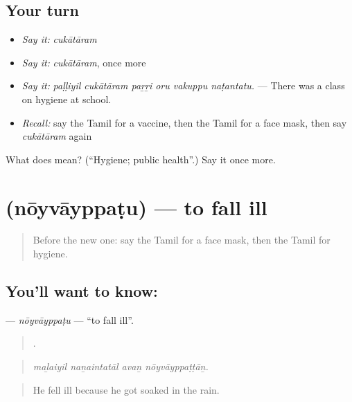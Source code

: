 \subsection*{Your turn}
\begin{itemize}
\raggedright
  \item \emph{Say it:} \emph{cukātāram}
  \item \emph{Say it:} \emph{cukātāram}, once more
  \item \emph{Say it:} \emph{paḷḷiyil cukātāram paṟṟi oru vakuppu naṭantatu.} — There was a class on hygiene at school.
  \item \emph{Recall:} say the Tamil for a vaccine, then the Tamil for a face mask, then say \emph{cukātāram} again
\end{itemize}

\begin{tcolorbox}[breakable,colback=teal!4,colframe=teal!35!black,title={Before you move on}]
What does  mean? (\textquotedblleft{}Hygiene; public health\textquotedblright{}.) Say it once more.
\end{tcolorbox}
\section[\texorpdfstring{\ta{நோய்வாய்ப்படு} (nōyvāyppaṭu)}{நோய்வாய்ப்படு (nōyvāyppaṭu)}]{ (nōyvāyppaṭu) — to fall ill}

\label{lesson:TA-C476-noyvayppatu}



\begin{quote}
Before the new one: say the Tamil for a face mask, then the Tamil for hygiene.
\end{quote}

\subsection*{You'll want to know: }
\textbf{} — \emph{nōyvāyppaṭu} — \textquotedblleft{}to fall ill\textquotedblright{}.

\begin{quote}
   .
\end{quote}

\begin{quote}
\emph{maḻaiyil naṉaintatāl avaṉ nōyvāyppaṭṭāṉ.}
\end{quote}

\begin{quote}
He fell ill because he got soaked in the rain.
\end{quote}

